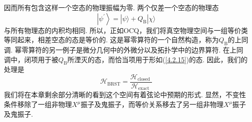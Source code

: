 因而所有包含这样一个空态的物理振幅为零. 两个仅差一个空态的物理态
\begin{equation}
\left|\psi^{\prime}\right\rangle=|\psi\rangle+Q_{\mathrm{B}}|\chi\rangle
\end{equation}
与所有物理态的内积均相同. 所以，正如OCQ，我们将真空物理空间与一组等价类等同起来，相差空态的态是等价的. 这是幂零算符的一个自然构造，称为$Q_{\mathrm{B}}$的上同调. 幂零算符的另一例子是微分几何中的外微分以及拓扑学中的边界算符. 在上同调中，闭项用于被$Q_{\mathrm{B}}$所湮灭的态，而恰当项用于形如(\ref{4.2.15})的态. 因此，我们的处理是
\begin{equation}
\mathscr{H}_{\mathrm{BRST}}=\frac{\mathscr{H}_{\text {closed }}}{\mathscr{H}_{\text {exact }}}
\end{equation}
我们将在本章剩余部分清晰的看到这个空间有着弦论中预期的形式. 显然，不变性条件移除了一组非物理$X^\mu$振子及鬼振子，而等价关系移去了另一组非物理$X^\mu$振子及鬼振子.\\

